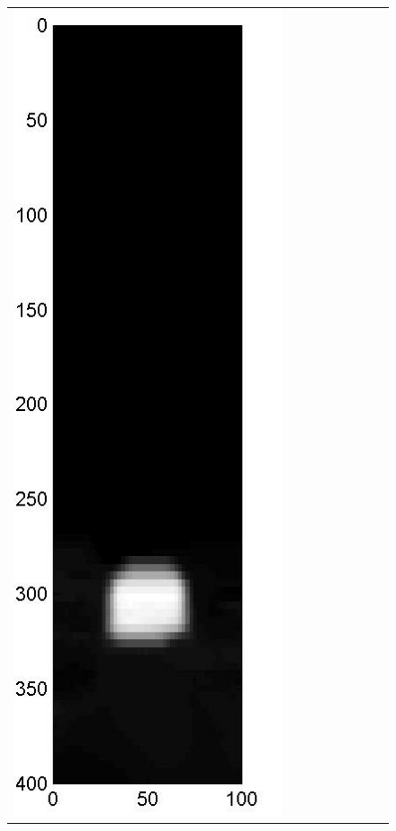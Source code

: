 \documentclass[english]{siamltex}
\begin{document}
{\begin{figure}[!h]
\begin{center}
\begin{tabular}{|c|c|c|c|c|c|c|c|c|}
			\includegraphics[width=.9\iwidth]{figures/newFigs/noisy/resultsExp-7-mkTV}
			&

\end{tabular}
\end{center}
\end{figure}}
\end{document}
